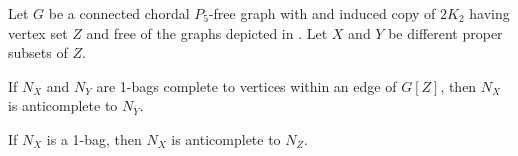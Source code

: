 \begin{lemma}
    \label{lem:neighborhoods_chordal_anti}
    Let $G$ be a connected chordal $P_5$-free graph with and induced copy of
    $2K_2$ having vertex set $Z$ and free of the graphs depicted in
    . Let $X$ and $Y$ be different proper
    subsets of $Z$.
    \begin{lemenum}
        \item If $N_X$ and $N_Y$ are 1-bags complete to vertices within an edge
            of $G[Z]$, then $N_X$ is anticomplete to $N_Y$.
            \label{lem:chordal_anti_2}
        \item If $N_X$ is a 1-bag, then $N_X$ is anticomplete to $N_Z$.
            \label{lem:chordal_anti_1}
    \end{lemenum}
\end{lemma}

